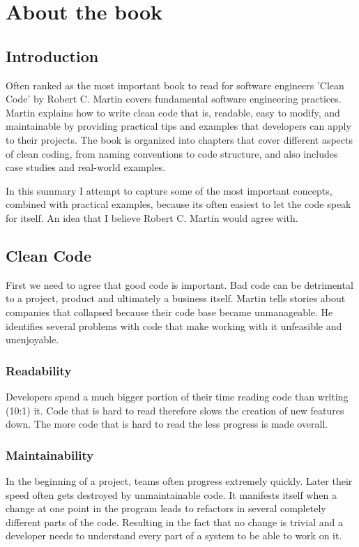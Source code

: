 \section{About the book}

\subsection{Introduction}

Often ranked as the most important book to read for software engineers 'Clean Code' by Robert C. Martin covers fundamental software engineering practices. Martin explains how to write clean code that is, readable, easy to modify, and maintainable by providing practical tips and examples that developers can apply to their projects. The book is organized into chapters that cover different aspects of clean coding, from naming conventions to code structure, and also includes case studies and real-world examples.

In this summary I attempt to capture some of the most important concepts, combined with practical examples, because its often easiest to let the code speak for itself. An idea that I believe Robert C. Martin would agree with.

\subsection{Clean Code}
First we need to agree that good code is important. Bad code can be detrimental to a project, product and ultimately a business itself. Martin tells stories about companies that collapsed because their code base became unmanageable. He identifies several problems with code that make working with it unfeasible and unenjoyable.

\subsubsection{Readability}
Developers spend a much bigger portion of their time reading code than writing (10:1) it.\cite{10:1} Code that is hard to read therefore slows the creation of new features down. The more code that is hard to read the less progress is made overall.

\subsubsection{Maintainability}
In the beginning of a project, teams often progress extremely quickly. Later their speed often gets destroyed by unmaintainable code. It manifests itself when a change at one point in the program leads to refactors in several completely different parts of the code. Resulting in the fact that no change is trivial and a developer needs to understand every part of a system to be able to work on it.

